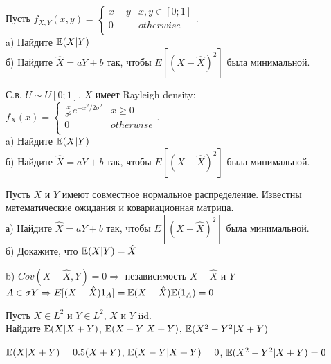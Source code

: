\begin{problem}
Пусть $f_{X,Y}(x,y)=
\begin{cases}
  x+y & x,y \in [0;1] \\
  0 & otherwise \\
\end{cases}$. \\
a) Найдите $\mathbb{E}(X|Y)$ \\
б) Найдите $\hat{X}=aY+b$ так, чтобы $E[(X-\hat{X})^{2}]$ была
минимальной. 
\end{problem} 
\begin{solution} 

\end{solution}

\begin{problem}
С.в. $U\sim U[0;1]$, $X$ имеет Rayleigh density: \\
$f_{X}(x)=
\begin{cases}
  \frac{x}{\sigma^{2}}e^{-x^{2}/2\sigma^{2}} & x\ge 0 \\
  0 & otherwise \\
\end{cases}$. \\
a) Найдите $\mathbb{E}(X|Y)$ \\
б) Найдите $\hat{X}=aY+b$ так, чтобы $E[(X-\hat{X})^{2}]$ была
минимальной. 
\end{problem} 
\begin{solution} 

\end{solution}

\begin{problem}
Пусть $X$ и $Y$ имеют совместное нормальное распределение.
Известны математические ожидания и ковариационная матрица. \\
а) Найдите $\hat{X}=aY+b$ так, чтобы $E[(X-\hat{X})^{2}]$ была
минимальной. \\
б) Докажите, что $\mathbb{E}(X|Y)=\hat{X}$ 
\end{problem} 
\begin{solution} 


b) $Cov(X-\hat{X},Y)=0 \Rightarrow $ независимость $X-\hat{X}$ и
$Y$ \\
$A\in\sigma{Y} \Rightarrow
E[(X-\hat{X})1_{A}]=\mathbb{E}(X-\hat{X})\mathbb{E}(1_{A})=0$ 
\end{solution}

\begin{problem}
Пусть $X\in L^{2}$ и $Y\in L^{2}$, $X$ и $Y$ iid. \\
Найдите $\mathbb{E}(X|X+Y)$, $\mathbb{E}(X-Y|X+Y)$, $\mathbb{E}(X^{2}-Y^{2}|X+Y)$ 
\end{problem} 
\begin{solution} 

$\mathbb{E}(X|X+Y)=0.5(X+Y)$, $\mathbb{E}(X-Y|X+Y)=0$, $\mathbb{E}(X^{2}-Y^{2}|X+Y)=0$ 
\end{solution}

